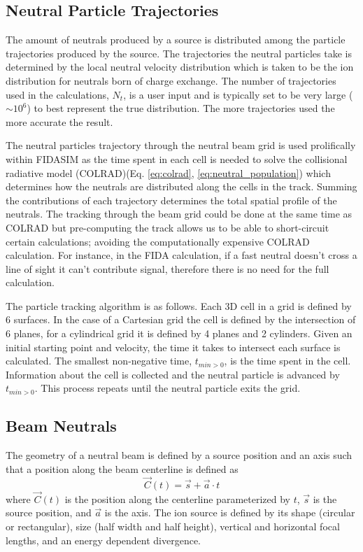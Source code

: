 \subsection{Neutral Particle Trajectories}
The amount of neutrals produced by a source is distributed among the particle trajectories produced by the source. The trajectories the neutral particles take is determined by the local neutral velocity distribution which is taken to be the ion distribution for neutrals born of charge exchange. The number of trajectories used in the calculations, $N_t$, is a user input and is typically set to be very large ($\sim10^6$) to best represent the true distribution. The more trajectories used the more accurate the result.

The neutral particles trajectory through the neutral beam grid is used prolifically within FIDASIM as the time spent in each cell is needed to solve the collisional radiative model (COLRAD)(Eq. \ref{eq:colrad}, \ref{eq:neutral_population}) which determines how the neutrals are distributed along the cells in the track. Summing the contributions of each trajectory determines the total spatial profile of the neutrals. The tracking through the beam grid could be done at the same time as COLRAD but pre-computing the track allows us to be able to short-circuit certain calculations; avoiding the computationally expensive COLRAD calculation. For instance, in the FIDA calculation, if a fast neutral doesn't cross a line of sight it can't contribute signal, therefore there is no need for the full calculation.

The particle tracking algorithm is as follows.
Each 3D cell in a grid is defined by 6 surfaces. In the case of a Cartesian grid the cell is defined by the intersection of 6 planes, for a cylindrical grid it is defined by 4 planes and 2 cylinders. Given an initial starting point and velocity, the time it takes to intersect each surface is calculated. The smallest non-negative time, $t_{min>0}$, is the time spent in the cell. Information about the cell is collected and the neutral particle is advanced by $t_{min>0}$. This process repeats until the neutral particle exits the grid.

\subsection{Beam Neutrals}
The geometry of a neutral beam is defined by a source position and an axis such that a position along the beam centerline is defined as
\begin{equation}\label{eq:nbi_geom}
    \vec{C}(t) = \vec{s} + \vec{a} \cdot t
\end{equation}
where $\vec{C}(t)$ is the position along the centerline parameterized by $t$, $\vec{s}$ is the source position, and $\vec{a}$ is the axis. The ion source is defined by its shape (circular or rectangular), size (half width and half height), vertical and horizontal focal lengths, and an energy dependent divergence. 

